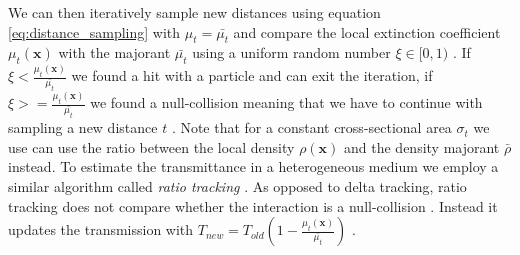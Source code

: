 We can then iteratively sample new distances using equation \ref{eq:distance_sampling} with $\mu_t=\bar{\mu_t}$ and compare the local extinction coefficient $\mu_t(\boldsymbol{x})$ with the majorant $\bar{\mu_t}$ using a uniform random number $\xi\in[0,1)$ \cite{spectral_and_decomposition_tracking}.
If $\xi<\frac{\mu_t(\boldsymbol{x})}{\bar{\mu_t}}$ we found a hit with a particle and can exit the iteration, if $\xi>=\frac{\mu_t(\boldsymbol{x})}{\bar{\mu_t}}$ we found a null-collision meaning that we have to continue with sampling a new distance $t$ \cite{spectral_and_decomposition_tracking}.
Note that for a constant cross-sectional area $\sigma_t$ we use can use the ratio between the local density $\rho(\boldsymbol{x})$ and the density majorant $\bar{\rho}$ instead.
To estimate the transmittance in a heterogeneous medium we employ a similar algorithm called \textit{ratio tracking} \cite{novak_ratio_tracking}.
As opposed to delta tracking, ratio tracking does not compare whether the interaction is a null-collision \cite{novak_ratio_tracking}.
Instead it updates the transmission with $T_{new} = T_{old}(1 - \frac{\mu_t(\boldsymbol{x})}{\bar{\mu_t}})$ \cite{novak_ratio_tracking}.

